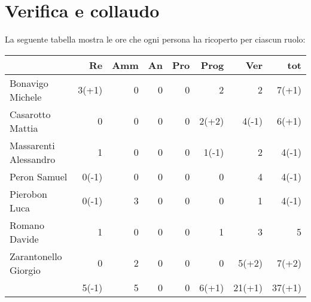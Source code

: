 \section{Verifica e collaudo}


La seguente tabella mostra le ore che ogni persona ha ricoperto per ciascun ruolo:
\begin{table}[ht]
    \begin{tabularx}{\linewidth}{X|rrrrrrr}
    \rowcolor{gray!30}& Re & Amm & An & Pro & Prog & Ver & tot \\
    \hline
    Bonavigo Michele                        & 3(+1)    & 0          & 0       & 0     & 2       & 2       & 7(+1) \\

    \rowcolor{gray!10}Casarotto Mattia      & 0        & 0          & 0       & 0     & 2(+2)   & 4(-1)   & 6(+1) \\

    Massarenti Alessandro                   & 1        & 0          & 0       & 0     & 1(-1)   & 2       & 4(-1) \\ 

    \rowcolor{gray!10}Peron Samuel          & 0(-1)    & 0          & 0       & 0     & 0       & 4       & 4(-1) \\ 

    Pierobon Luca                           & 0(-1)    & 3          & 0       & 0     & 0       & 1       & 4(-1) \\ 

    \rowcolor{gray!10}Romano Davide         & 1        & 0          & 0       & 0     & 1       & 3       & 5\\

    Zarantonello Giorgio                    & 0        & 2          & 0       & 0     & 0       & 5(+2)   & 7(+2)\\

    \hline                                  & 5(-1)    & 5          & 0       & 0     & 6(+1)   & 21(+1)  & 37(+1)\\  
    \end{tabularx}
\end{table}

